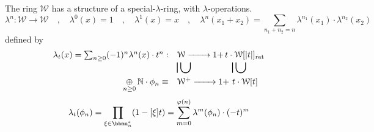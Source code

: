 \documentclass[leqno]{article}
\newcommand{\N}{\mathbb{N}}
\newcommand{\oplussum}{\mathop{\oplus}}
\numberwithin{equation}{section}
\begin{document}
  The ring $\mathcal{W}$ has a structure of a special-$\lambda$-ring, with $\lambda$-operations.
  \begin{equation}
    \label{eq:13.32}
    \lambda^n:\mathcal{W}\to\mathcal{W}\quad, \quad \lambda^0(x)=1\quad ,\quad
    \lambda^1(x)=x\quad, \quad \lambda^n(x_1+x_2)=\sum\limits_{n_1+n_2=n}\lambda^{n_1}(x_1)\cdot\lambda^{n_2}(x_2)
  \end{equation}
  defined by
  \begin{equation}
    \label{eq:13.33}
    \begin{array}[h]{rll}
      \lambda_t(x)=\sum_{n\ge 0} (-1)^n\lambda^n(x)\cdot t^n: &\mathcal{W}\xrightarrow{\qquad} 1+ &\hspace{-3mm} t\cdot\mathcal{W}[|t|]_{\text{rat}} \vspace{-.3cm}\\
      \ & \rotatebox{270}{\huge $\supseteq$} & \rotatebox{270}{\huge $\supseteq$} \vspace{.1cm}\\
      \oplussum\limits_{n\ge 0}\N\cdot \phi_n \equiv &\mathcal{W}^+\xrightarrow{\qquad} 1+\hspace{-.5cm} &t\cdot\mathcal{W}[t]
    \end{array}
\end{equation}
\begin{equation}
  \label{eq:13.34}
  \lambda_t(\phi_n)=\prod\limits_{\xi\in\bbmu_n^*} (1-[\xi]t)=\sum\limits_{m=0}^{\varphi(n)}\lambda^m(\phi_n)\cdot (-t)^m
\end{equation}
\end{document}
